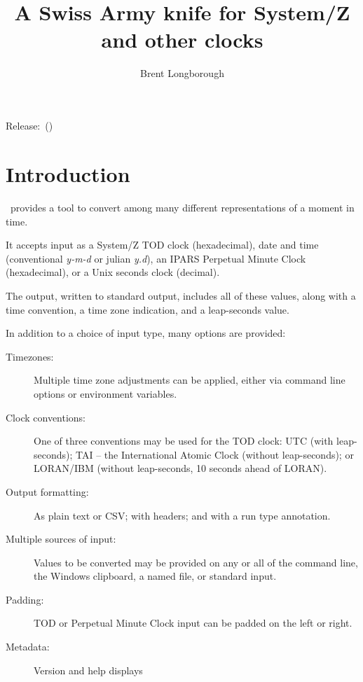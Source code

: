 \documentclass[a4paper,12pt,oneside,openany]{memoir}
\begin{document}
\frontmatter
\title{%
	~\\[2\baselineskip]
	\Huge \tpfname\\[2ex]%
	\Large A Swiss Army knife for System/Z and other clocks
	}
\author{Brent Longborough}
\date{ }
\maketitle

{\centering
Release:\gitReln\ (\gitAbbrevHash)\\
}
\thispagestyle{empty}
\clearforchapter
\tableofcontents*
\mainmatter
\pagestyle{giruled}
\chapter{Introduction}
\tpname\ provides a tool to convert among
many different representations of a moment in time.

It accepts input as a System/Z TOD clock (hexadecimal),
date and time
(conventional \textit{y-m-d} or julian \textit{y.d}),
an IPARS Perpetual Minute Clock (hexadecimal),
or a Unix seconds clock (decimal).

The output, written to standard output,
includes all of these values,
along with a time convention, a time zone indication,
and a leap-seconds value.

In addition to a choice of input type,
many options are provided:

\begin{description}
    \item[Timezones:]
    Multiple time zone adjustments can be applied,
    either via command line options or
    environment variables.

    \item[Clock conventions:]
    One of three conventions may be used for
    the TOD clock: UTC (with leap-seconds);
    TAI -- the International Atomic Clock
    (without leap-seconds); or
    LORAN/IBM (without leap-seconds,
    10 seconds ahead of LORAN).

    \item[Output formatting:]
    As plain text or CSV;
    with headers; and with a run type annotation.

    \item[Multiple sources of input:]
    Values to be converted may be provided
    on any or all of the command line,
    the Windows clipboard, a named file,
    or standard input.

    \item[Padding:] TOD or Perpetual Minute Clock input
    can be padded on the left or right.

    \item[Metadata:] Version and help displays

\end{description}
\clearpage
\end{document}
